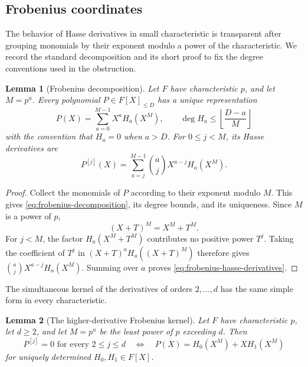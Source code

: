 \documentclass[11pt,letterpaper]{article}
\newtheorem{lemma}[lemma]{Lemma}
\theoremstyle{definition}
\begin{document}
\subsection{Frobenius coordinates}

The behavior of Hasse derivatives in small characteristic is transparent
after grouping monomials by their exponent modulo a power of the
characteristic. We record the standard decomposition and its short proof to
fix the degree conventions used in the obstruction.

\begin{lemma}[Frobenius decomposition]
\label{lem:frobenius-decomposition}
Let \(F\) have characteristic \(p\), and let \(M=p^u\).  Every polynomial
\(P\in F[X]_{\leq D}\) has a unique representation
\begin{equation}
  P(X)=\sum_{a=0}^{M-1}X^aH_a(X^M),
  \qquad
  \deg H_a\leq\left\lfloor\frac{D-a}{M}\right\rfloor
  \label{eq:frobenius-decomposition}
\end{equation}
with the convention that \(H_a=0\) when \(a>D\).  For \(0\leq j<M\), its
Hasse derivatives are
\begin{equation}
  P^{[j]}(X)
  =
  \sum_{a=j}^{M-1}\binom ajX^{a-j}H_a(X^M).
  \label{eq:frobenius-hasse-derivatives}
\end{equation}
\end{lemma}

\begin{proof}
Collect the monomials of \(P\) according to their exponent modulo \(M\).
This gives \eqref{eq:frobenius-decomposition}, its degree bounds, and its
uniqueness.  Since \(M\) is a power of \(p\),
\[
  (X+T)^M=X^M+T^M.
\]
For \(j<M\), the factor \(H_a(X^M+T^M)\) contributes no positive power
\(T^j\).  Taking the coefficient of \(T^j\) in
\((X+T)^aH_a((X+T)^M)\) therefore gives
\(\binom ajX^{a-j}H_a(X^M)\).  Summing over \(a\) proves
\eqref{eq:frobenius-hasse-derivatives}.
\end{proof}

The simultaneous kernel of the derivatives of orders \(2,\ldots,d\) has
the same simple form in every characteristic.

\begin{lemma}[The higher-derivative Frobenius kernel]
\label{lem:higher-derivative-kernel}
Let \(F\) have characteristic \(p\), let \(d\geq2\), and let \(M=p^u\) be
the least power of \(p\) exceeding \(d\).  Then
\begin{equation}
  P^{[j]}=0\text{ for every }2\leq j\leq d
  \quad\Longleftrightarrow\quad
  P(X)=H_0(X^M)+XH_1(X^M)
  \label{eq:higher-derivative-kernel}
\end{equation}
for uniquely determined \(H_0,H_1\in F[X]\).
\end{lemma}
\end{document}
